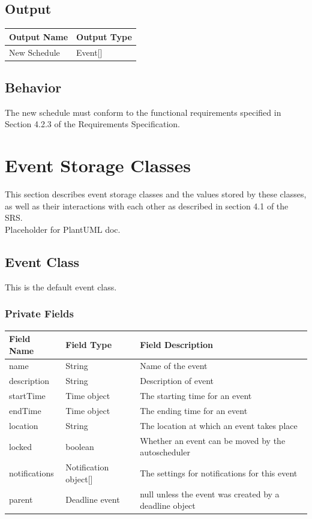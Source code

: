 \documentclass{scrreprt}
\begin{document}
\section{Output}
\begin{center}
\begin{longtable}{ | p{5cm} | p{9cm} | }
\hline
\textbf{Output Name} & \textbf{Output Type}\\
\hline
New Schedule & Event[] \\
\hline
\end{longtable}
\end{center}

\section{Behavior}
The new schedule must conform to the functional requirements specified in Section 4.2.3 of the Requirements Specification.


\chapter{Event Storage Classes}

This section describes event storage classes and the values stored by these classes, as well as their interactions with each other as described in section 4.1 of the SRS. \\

Placeholder for PlantUML doc.

\section{Event Class}

This is the default event class.

\subsection{Private Fields}

\begin{center}
\begin{longtable}{ | p{3cm} | p{6cm} | p{6cm} | }
\hline
\textbf{Field Name} & \textbf{Field Type} & \textbf{Field Description} \\
\hline
name & String & Name of the event \\
\hline
description & String & Description of event \\
\hline
startTime & Time object & The starting time for an event \\
\hline
endTime & Time object & The ending time for an event \\
\hline
location & String & The location at which an event takes place \\
\hline
locked & boolean & Whether an event can be moved by the autoscheduler \\
\hline
notifications & Notification object[] & The settings for notifications for this event \\
\hline
parent & Deadline event & null unless the event was created by a deadline object \\
\hline
\end{longtable}
\end{center}
\end{document}
